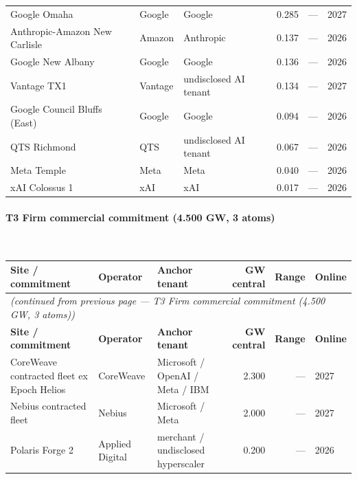 \documentclass[11pt,a4paper]{article}
\begin{document}
\begin{small}
\begin{longtable}{@{}p{4.5cm} p{2.4cm} p{2.4cm} r r p{1.8cm}@{}}
Google Omaha & Google & Google & 0.285 & — & 2027 \\

Anthropic-Amazon New Carlisle & Amazon & Anthropic & 0.137 & — & 2026 \\

Google New Albany & Google & Google & 0.136 & — & 2026 \\

Vantage TX1 & Vantage & undisclosed AI tenant & 0.134 & — & 2027 \\

Google Council Bluffs (East) & Google & Google & 0.094 & — & 2026 \\

QTS Richmond & QTS & undisclosed AI tenant & 0.067 & — & 2026 \\

Meta Temple & Meta & Meta & 0.040 & — & 2026 \\

xAI Colossus 1 & xAI & xAI & 0.017 & — & 2026 \\

\end{longtable}\end{small}


\paragraph{\textbf{T3 Firm commercial commitment (4.500 GW, 3 atoms)}}~\\[0.3em]
\noindent\begin{small}
\begin{longtable}{@{}p{4.5cm} p{2.4cm} p{2.4cm} r r p{1.8cm}@{}}
\toprule
\textbf{Site / commitment} & \textbf{Operator} & \textbf{Anchor tenant} & \textbf{GW central} & \textbf{Range} & \textbf{Online} \\
\midrule
\endfirsthead
\multicolumn{6}{l}{\textit{(continued from previous page — T3 Firm commercial commitment (4.500 GW, 3 atoms))}} \\
\toprule
\textbf{Site / commitment} & \textbf{Operator} & \textbf{Anchor tenant} & \textbf{GW central} & \textbf{Range} & \textbf{Online} \\
\midrule
\endhead
\bottomrule
\endfoot

CoreWeave contracted fleet ex Epoch Helios & CoreWeave & Microsoft / OpenAI / Meta / IBM & 2.300 & — & 2027 \\

Nebius contracted fleet & Nebius & Microsoft / Meta & 2.000 & — & 2027 \\

Polaris Forge 2 & Applied Digital & merchant / undisclosed hyperscaler & 0.200 & — & 2026 \\

\end{longtable}\end{small}
\end{document}
